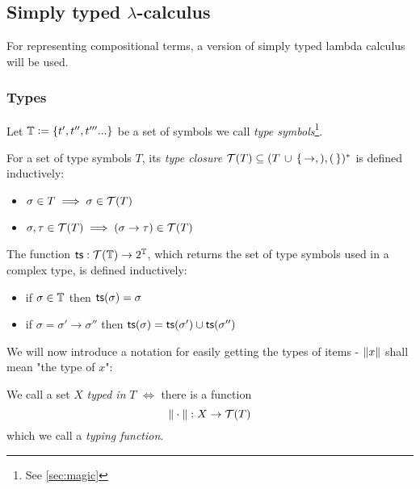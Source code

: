 \documentclass[main.tex]{subfiles}
\begin{document}
\subsection{Simply typed $\lambda$-calculus}
\label{sec:purelambda}

For representing compositional terms, a version of simply typed lambda calculus
will be used.

\subsubsection{Types}
\label{purelambda:types}
Let $\mathbb{T} \vcentcolon= \{ t', t'', t''' ... \}$ be a set of symbols we call
    \emph{type symbols}\footnote{See \cref{sec:magic}}.

\begin{defn}
    \label{def:tclos}
    For a set of type symbols $T$, its \emph{type closure}
    $\mathcal{T}( T ) \subseteq (T \, \cup \,\{\, \rightarrow, ), ( \,\})^*$ is defined
    inductively:

    \begin{itemize}
        \item $\sigma \in T \implies \sigma \in \mathcal{T}( T )$
        \item $\sigma, \tau \in \mathcal{T}( T ) \implies (\sigma \rightarrow \tau) \in \mathcal{T}( T )$
    \end{itemize}
\end{defn}

\begin{defn}
    The function $\mathsf{ts} : \mathcal{T}( \mathbb{T} ) \rightarrow 2^{\mathbb{T}}$, which
    returns the set of type symbols used in a complex type, is defined inductively:

    \begin{itemize}
        \item if $\sigma \in \mathbb{T}$ then $\mathsf{ts}(\sigma) = \sigma$
        \item if $\sigma = \sigma' \rightarrow \sigma''$ then
            $\mathsf{ts}(\sigma) = \mathsf{ts}(\sigma') \cup \mathsf{ts}(\sigma'')$
    \end{itemize}
\end{defn}

We will now introduce a notation for easily getting the types of items -
$\|x\|$ shall mean "the type of $x$":

\begin{defn}
    We call a set $X$ \emph{typed in} $T$ $\iff$ there is a function
    \[ \|\cdot\| : X \rightarrow \mathcal{T}( T ) \]
    which we call a \emph{typing function}.
\end{defn}
\end{document}
